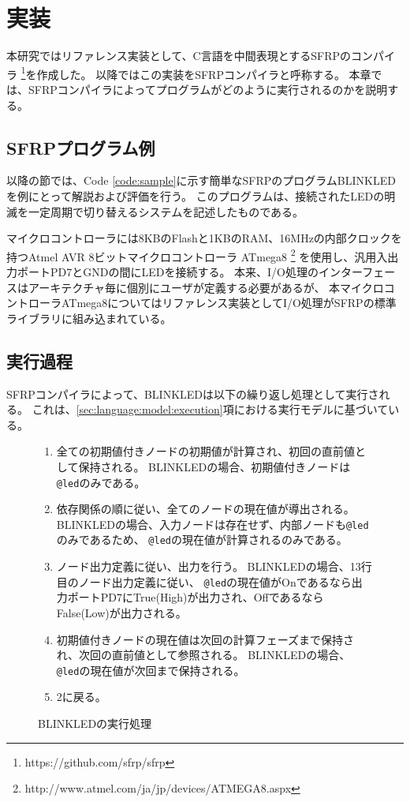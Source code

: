\chapter{実装}\label{sec:implementation}
本研究ではリファレンス実装として、C言語を中間表現とするSFRPのコンパイラ
\footnote{https://github.com/sfrp/sfrp}を作成した。
以降ではこの実装をSFRPコンパイラと呼称する。
本章では、SFRPコンパイラによってプログラムがどのように実行されるのかを説明する。

\section{SFRPプログラム例}\label{sec:implementation:example}
以降の節では、Code \ref{code:sample}に示す簡単なSFRPのプログラムBLINKLEDを例にとって解説および評価を行う。
このプログラムは、接続されたLEDの明滅を一定周期で切り替えるシステムを記述したものである。

マイクロコントローラには8KBのFlashと1KBのRAM、16MHzの内部クロックを持つAtmel AVR 8ビットマイクロコントローラ ATmega8
\footnote{http://www.atmel.com/ja/jp/devices/ATMEGA8.aspx}
を使用し、汎用入出力ポートPD7とGNDの間にLEDを接続する。
本来、I/O処理のインターフェースはアーキテクチャ毎に個別にユーザが定義する必要があるが、
本マイクロコントローラATmega8についてはリファレンス実装としてI/O処理がSFRPの標準ライブラリに組み込まれている。

\newpage



\section{実行過程}\label{sec:implementation:execution}
SFRPコンパイラによって、BLINKLEDは以下の繰り返し処理として実行される。
これは、\ref{sec:language:model:execution}項における実行モデルに基づいている。
\begin{figure}[h]
\begin{screen}
\begin{enumerate}
  \item 全ての初期値付きノードの初期値が計算され、初回の直前値として保持される。
    BLINKLEDの場合、初期値付きノードは\texttt{@led}のみである。
  \item 依存関係の順に従い、全てのノードの現在値が導出される。
    BLINKLEDの場合、入力ノードは存在せず、内部ノードも\texttt{@led}のみであるため、
    \texttt{@led}の現在値が計算されるのみである。
  \item ノード出力定義に従い、出力を行う。
    BLINKLEDの場合、13行目のノード出力定義に従い、
    \texttt{@led}の現在値がOnであるなら出力ポートPD7にTrue(High)が出力され、OffであるならFalse(Low)が出力される。
  \item 初期値付きノードの現在値は次回の計算フェーズまで保持され、次回の直前値として参照される。
    BLINKLEDの場合、\texttt{@led}の現在値が次回まで保持される。
  \item 2に戻る。
\end{enumerate}
\end{screen}
\caption{BLINKLEDの実行処理}
\label{fig:imp:exec}
\end{figure}

